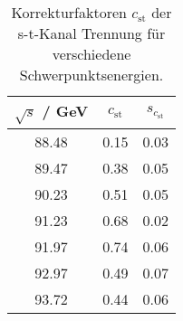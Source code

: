 \begin{table}[H]
\caption{Korrekturfaktoren $c_{\text{st}}$ der s-t-Kanal Trennung für verschiedene Schwerpunktsenergien.}
\begin{center}
\begin{tabular}{|c|c|c|}
  \hline
  $\sqrt{s}$ / GeV & $c_{\text{st}}$ & $s_{c_{\text{st}}}$ \\ \hline
  88.48 & 0.15 & 0.03 \\ \hline
  89.47 & 0.38 & 0.05 \\ \hline
  90.23 & 0.51 & 0.05 \\ \hline
  91.23 & 0.68 & 0.02 \\ \hline
  91.97 & 0.74 & 0.06 \\ \hline
  92.97 & 0.49 & 0.07 \\ \hline
  93.72 & 0.44 & 0.06 \\ \hline
\end{tabular}
\end{center}
\label{tab:st:corrs}
\end{table}

